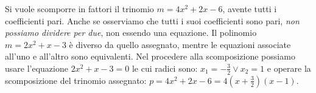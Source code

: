 \osservazione
Si vuole scomporre in fattori il trinomio $m = 4 x^{2} + 2 x - 6$, avente tutti 
i coefficienti pari. Anche se osserviamo che tutti i suoi coefficienti sono 
pari, \emph{non possiamo dividere per due}, non essendo una equazione. Il 
polinomio $m = 2 x^{2} + x - 3$ è diverso da quello assegnato, mentre le 
equazioni associate all'uno e all'altro sono equivalenti. Nel procedere alla 
scomposizione possiamo usare l'equazione $2 x^{2} + x - 3 = 0$ le cui radici 
sono:
$x_{1} = - \frac{3}{2} \vee x_{2} = 1$ e operare la scomposizione del trinomio 
assegnato: $p = 4 x^{2} + 2 x - 6 = 4 \left( x + \frac{3}{2} \right) ( x - 1)$.

% 
% 
